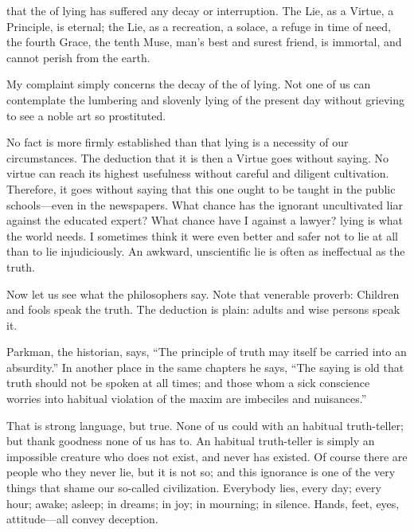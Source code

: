 \documentclass{novelette} %
\begin{document}
\blankpage

\mainmatter

\begin{opening}
\null\null\null\null\null\null
{}
\null
{}
\null\null\null\null\null
\end{opening}

 that the  of lying has
suffered any decay or interruption. The Lie, as a Virtue, a
Principle, is eternal; the Lie, as a recreation, a solace, a refuge in
time of need, the fourth Grace, the tenth Muse, man's best and surest
friend, is immortal, and cannot perish from the earth.

My complaint simply concerns the decay of the  of lying.
Not one of us can contemplate the lumbering and slovenly lying of the
present day without grieving to see a noble art so prostituted.

No fact is more firmly established than that lying is a necessity of our
circumstances. The deduction that it is then a Virtue goes without
saying. No virtue can reach its highest usefulness without careful and
diligent cultivation. Therefore, it goes without saying that this one
ought to be taught in the public schools---even in the newspapers. What
chance has the ignorant uncultivated liar against the educated expert?
What chance have I against a lawyer?  lying
is what the world needs. I sometimes think it were even better and safer
not to lie at all than to lie injudiciously. An awkward, unscientific
lie is often as ineffectual as the truth.

Now let us see what the philosophers say. Note that venerable proverb:
Children and fools  speak the truth. The deduction is plain:
adults and wise persons  speak it.


Parkman, the historian, says,
``The principle of truth may itself be carried into an absurdity.'' In
another place in the same chapters he says, ``The saying is old that
truth should not be spoken at all times; and those whom a sick
conscience worries into habitual violation of the maxim are imbeciles
and nuisances.''

That is strong language, but true.
None of us could  with an habitual truth-teller;
but thank goodness none of us has to. An habitual truth-teller is simply
an impossible creature who does not exist, and never has existed.
Of course there are people who  they
never lie, but it is not so; and this ignorance is one of the very
things that shame our so-called civilization. Everybody lies, every day;
every hour; awake; asleep; in dreams; in joy; in mourning; in silence.
Hands, feet, eyes, attitude---all convey deception.
\end{document}
